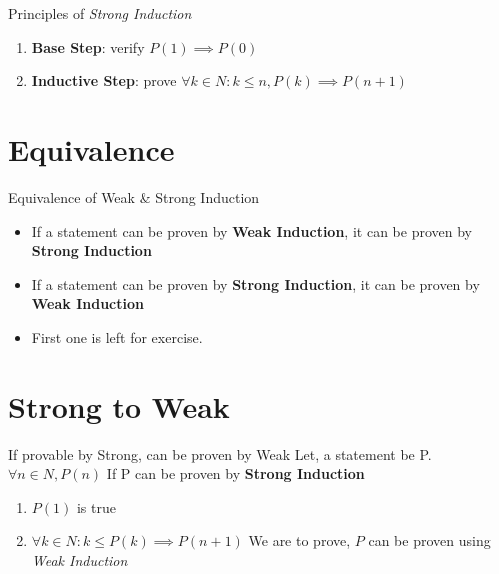 \documentclass{beamer}
\begin{document}
\begin{frame}{Principles of \textit{Strong Induction}}
    \begin{enumerate}
        \item \textbf{Base Step}: verify $P(1) \implies P(0)$
        \item \textbf{Inductive Step}: prove 
        $\forall k \in N: k \leq n, P(k) \implies P(n+1)$
    \end{enumerate}
\end{frame}

\section{Equivalence}
\begin{frame}{Equivalence of Weak \& Strong Induction}
    \begin{itemize}
        \item<1,3> If a statement can be proven by \textbf{Weak Induction}, it can be proven by \textbf{Strong Induction}
        \item<2,3> If a statement can be proven by \textbf{Strong Induction}, it can be proven by \textbf{Weak Induction}
        \item<3> First one is left for exercise.
    \end{itemize}
\end{frame}

\section{Strong to Weak}
\begin{frame}{If provable by Strong, can be proven by Weak}
Let, a statement be P. $\forall n \in N, P(n)$
If P can be proven by \textbf{Strong Induction}
\begin{enumerate}
    \item $P(1)$ is true
    \item $\forall k \in N : k \leq P(k) \implies P(n+1)$
    We are to prove, $P$ can be proven using \textit{Weak Induction}
\end{enumerate}
\end{frame}
\end{document}
